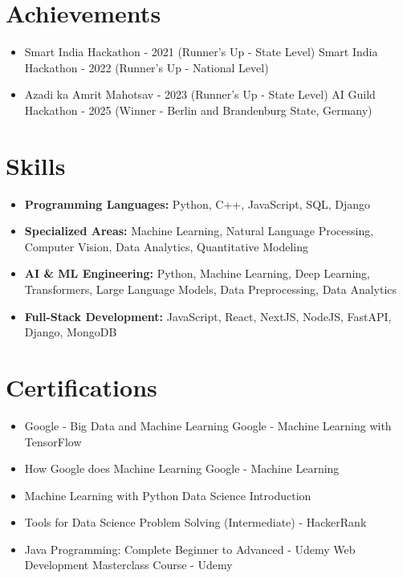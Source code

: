 \documentclass[a4paper,10pt]{article}
\begin{document}
\section*{Achievements}
\begin{itemize}
\item Smart India Hackathon - 2021 (Runner's Up - State Level) \hfill Smart India Hackathon - 2022 (Runner's Up - National Level)
\item Azadi ka Amrit Mahotsav - 2023 (Runner's Up - State Level) \hfill AI Guild Hackathon - 2025 (Winner - Berlin and Brandenburg State, Germany)
\end{itemize}

\section*{Skills}
\begin{itemize}
  \item \textbf{Programming Languages:} Python, C++, JavaScript, SQL, Django
  \item \textbf{Specialized Areas:} Machine Learning, Natural Language Processing, Computer Vision, Data Analytics, Quantitative Modeling
  \item \textbf{AI \& ML Engineering:} Python, Machine Learning, Deep Learning, Transformers, Large Language Models, Data Preprocessing, Data Analytics
  \item \textbf{Full-Stack Development:} JavaScript, React, NextJS, NodeJS, FastAPI, Django, MongoDB
\end{itemize}

\section*{Certifications}
\begin{itemize}
\item Google - Big Data and Machine Learning \hfill Google - Machine Learning with TensorFlow
\item How Google does Machine Learning \hfill Google - Machine Learning
\item Machine Learning with Python \hfill Data Science Introduction
\item Tools for Data Science \hfill Problem Solving (Intermediate) - HackerRank
\item Java Programming: Complete Beginner to Advanced - Udemy \hfill Web Development Masterclass Course - Udemy
\end{itemize}
\end{document}
